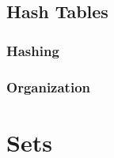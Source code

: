 
\subsection{Hash Tables}

\subsubsection{Hashing}

\subsubsection{Organization}

\csharpsubsection{\csharp}

\section{Sets}
\csharpsubsection{\csharp}

